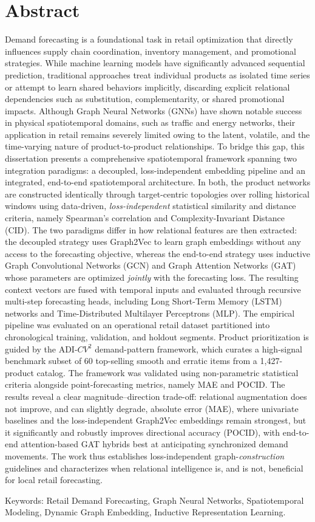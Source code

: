 
\chapter*{Abstract}
%
Demand forecasting is a foundational task in retail optimization that directly
influences supply chain coordination, inventory management, and promotional
strategies. While machine learning models have significantly advanced sequential
prediction, traditional approaches treat individual products as isolated time
series or attempt to learn shared behaviors implicitly, discarding explicit
relational dependencies such as substitution, complementarity, or shared
promotional impacts. Although Graph Neural Networks (GNNs) have shown notable
success in physical spatiotemporal domains, such as traffic and energy networks,
their application in retail remains severely limited owing to the latent, volatile,
and the time-varying nature of product-to-product relationships. To bridge this gap,
this dissertation presents a comprehensive spatiotemporal framework spanning two
integration paradigms: a decoupled, loss-independent embedding pipeline and an
integrated, end-to-end spatiotemporal architecture. In both, the product networks
are constructed identically through target-centric topologies over rolling
historical windows using data-driven, \emph{loss-independent} statistical
similarity and distance criteria, namely Spearman's correlation and
Complexity-Invariant Distance (CID). The two paradigms differ in how relational
features are then extracted: the decoupled strategy uses Graph2Vec to learn graph
embeddings without any access to the forecasting objective, whereas the end-to-end
strategy uses inductive Graph Convolutional Networks (GCN) and Graph Attention
Networks (GAT) whose parameters are optimized \emph{jointly} with the forecasting
loss. The resulting context vectors are fused with temporal inputs and evaluated
through recursive multi-step forecasting heads, including Long Short-Term Memory
(LSTM) networks and Time-Distributed Multilayer Perceptrons (MLP). The empirical
pipeline was evaluated on an operational retail dataset partitioned into
chronological training, validation, and holdout segments. Product prioritization is
guided by the ADI-$CV^2$ demand-pattern framework, which curates a high-signal
benchmark subset of 60 top-selling smooth and erratic items from a 1,427-product
catalog. The framework was validated using non-parametric statistical criteria
alongside point-forecasting metrics, namely MAE and POCID. The results reveal a
clear magnitude--direction trade-off: relational augmentation does not improve, and
can slightly degrade, absolute error (MAE), where univariate baselines and the
loss-independent Graph2Vec embeddings remain strongest, but it significantly and
robustly improves directional accuracy (POCID), with end-to-end attention-based GAT
hybrids best at anticipating synchronized demand movements. The work thus
establishes loss-independent graph-\emph{construction} guidelines and characterizes
when relational intelligence is, and is not, beneficial for local retail
forecasting.

Keywords: Retail Demand Forecasting, Graph Neural Networks, Spatiotemporal
Modeling, Dynamic Graph Embedding, Inductive Representation Learning.


\acresetall %
